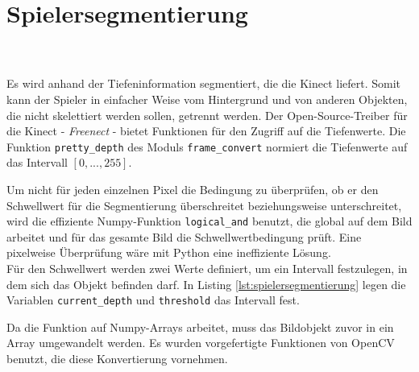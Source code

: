 \section{Spielersegmentierung}
\label{segmentierung}
\\\\
Es wird anhand der Tiefeninformation segmentiert, die die Kinect liefert. Somit kann der Spieler in einfacher Weise vom Hintergrund und von anderen Objekten, die nicht skelettiert werden sollen, getrennt werden. Der Open-Source-Treiber für die Kinect - \emph{Freenect} - bietet Funktionen für den Zugriff auf die
Tiefenwerte. Die Funktion \texttt{pretty\_depth} des Moduls
\texttt{frame\_convert} normiert die Tiefenwerte auf das 
Intervall $[0,...,255]$. 

Um nicht für jeden einzelnen Pixel die Bedingung zu überprüfen, ob er den Schwellwert für die Segmentierung überschreitet beziehungsweise unterschreitet, wird die effiziente Numpy-Funktion \texttt{logical\_and} benutzt, die global auf dem Bild arbeitet und für das gesamte Bild die Schwellwertbedingung prüft. Eine pixelweise Überprüfung wäre mit Python eine ineffiziente Lösung.\\ Für den Schwellwert werden zwei 
Werte definiert, um ein Intervall festzulegen, in dem sich das Objekt befinden darf. In Listing \ref{lst:spielersegmentierung} legen die Variablen \texttt{current\_depth} und \texttt{threshold} das Intervall fest. 

Da die Funktion auf Numpy-Arrays arbeitet, muss das Bildobjekt zuvor in ein Array umgewandelt werden. 
Es wurden vorgefertigte Funktionen von OpenCV benutzt, die diese Konvertierung vornehmen. 
